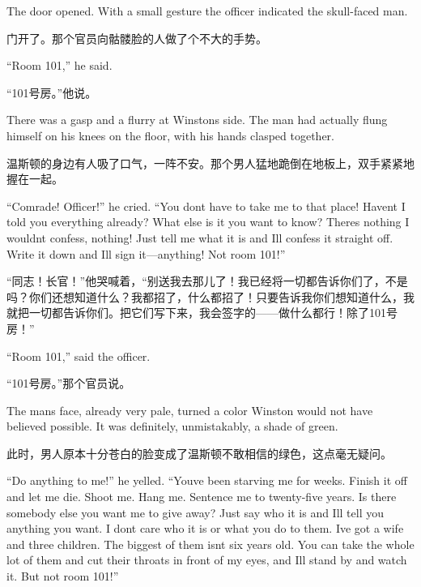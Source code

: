 \begin{paracol}{2}
\switchcolumn*

The door opened. With a small gesture the officer indicated the
skull-faced man.

\switchcolumn

门开了。那个官员向骷髅脸的人做了个不大的手势。

\switchcolumn*

``Room 101,'' he said.

\switchcolumn

``101号房。''他说。

\switchcolumn*

There was a gasp and a flurry at Winston\textquotesingle s side. The man
had actually flung himself on his knees on the floor, with his hands
clasped together.

\switchcolumn

温斯顿的身边有人吸了口气，一阵不安。那个男人猛地跪倒在地板上，双手紧紧地握在一起。

\switchcolumn*

``Comrade! Officer!'' he cried. ``You don\textquotesingle t have to take me
to that place! Haven\textquotesingle t I told you everything already?
What else is it you want to know? There\textquotesingle s nothing I
wouldn\textquotesingle t confess, nothing! Just tell me what it is and
I\textquotesingle ll confess it straight off. Write it down and
I\textquotesingle ll sign it---anything! Not room 101!''

\switchcolumn

``同志！长官！''他哭喊着，``别送我去那儿了！我已经将一切都告诉你们了，不是吗？你们还想知道什么？我都招了，什么都招了！只要告诉我你们想知道什么，我就把一切都告诉你们。把它们写下来，我会签字的——做什么都行！除了101号房！''

\switchcolumn*

``Room 101,'' said the officer.

\switchcolumn

``101号房。''那个官员说。

\switchcolumn*

The man\textquotesingle s face, already very pale, turned a color
Winston would not have believed possible. It was definitely,
unmistakably, a shade of green.

\switchcolumn

此时，男人原本十分苍白的脸变成了温斯顿不敢相信的绿色，这点毫无疑问。

\switchcolumn*

``Do anything to me!'' he yelled. ``You\textquotesingle ve been starving me
for weeks. Finish it off and let me die. Shoot me. Hang me. Sentence me
to twenty-five years. Is there somebody else you want me to give away?
Just say who it is and I\textquotesingle ll tell you anything you want.
I don\textquotesingle t care who it is or what you do to them.
I\textquotesingle ve got a wife and three children. The biggest of them
isn\textquotesingle t six years old. You can take the whole lot of them
and cut their throats in front of my eyes, and I\textquotesingle ll
stand by and watch it. But not room 101!''


\end{paracol}
